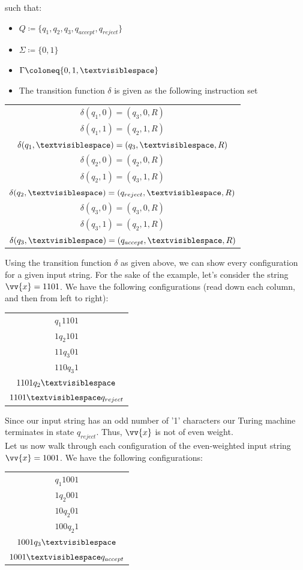 \documentclass{article}
\begin{document}
\begin{exmp}
\noindent such that:
\begin{itemize}
	\item $Q \coloneq \{ q_{1}, q_{2}, q_{3}, q_{accept}, q_{reject} \}$
	\item $\Sigma \coloneq \{ 0, 1 \}$
	\item $\Gamma \coloneq \{ 0, 1, \textvisiblespace \}$
	\item The transition function $\delta$ is given as the following instruction set
\end{itemize}
\begin{center}
	\begin{tabular}{ c }
	$\delta(q_{1}, 0) = (q_{3}, 0, R)$ \\
	$\delta(q_{1}, 1) = (q_{2}, 1, R)$ \\
	$\delta(q_{1}, \textvisiblespace) = (q_{3}, \textvisiblespace, R)$ \\
	$\delta(q_{2}, 0) = (q_{2}, 0, R)$ \\
	$\delta(q_{2}, 1) = (q_{3}, 1, R)$ \\
	$\delta(q_{2}, \textvisiblespace) = (q_{reject}, \textvisiblespace, R)$ \\
	$\delta(q_{3}, 0) = (q_{3}, 0, R)$ \\
	$\delta(q_{3}, 1) = (q_{2}, 1, R)$ \\
	$\delta(q_{3}, \textvisiblespace) = (q_{accept}, \textvisiblespace, R)$
	\end{tabular}
\end{center}
\noindent Using the transition function $\delta$ as given above, we can show every configuration for a given input string.  For the sake of the example, let's consider the string $\vv{x} = 1101$.  We have the following configurations (read down each column, and then from left to right):
\begin{center}
\begin{tabular}{ c }
	$q_{1}1101$ \\
	$1q_{2}101$ \\
	$11q_{3}01$ \\
	$110q_{3}1$ \\
	$1101q_{2} \textvisiblespace$ \\
	$1101 \textvisiblespace q_{reject}$
\end{tabular}
\end{center}
\noindent Since our input string has an odd number of '1' characters our Turing machine terminates in state $q_{reject}$. Thus, $\vv{x}$ is not of even weight. \\

\noindent Let us now walk through each configuration of the even-weighted input string $\vv{x} = 1001$.  We have the following configurations:
\begin{center}
\begin{tabular}{ c }
	$q_{1}1001$ \\
	$1q_{2}001$ \\
	$10q_{2}01$ \\
	$100q_{2}1$ \\
	$1001q_{3}\textvisiblespace$ \\
	$1001\textvisiblespace q_{accept}$
\end{tabular}
\end{center}
\end{exmp}
\end{document}
